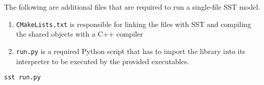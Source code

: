 

The following are additional files that are required to run a single-file SST model.

\begin{enumerate}
    \item \texttt{CMakeLists.txt} is responsible for linking the files with SST and compiling the shared objects with a C++ compiler
    \item \texttt{run.py} is a required Python script that has to import the library into its interpreter to be executed by the provided executables.
\end{enumerate}

\begin{lstlisting}[caption=A typical method to run the user's model in the SST framework,style=base]
sst run.py
\end{lstlisting}
\newpage
